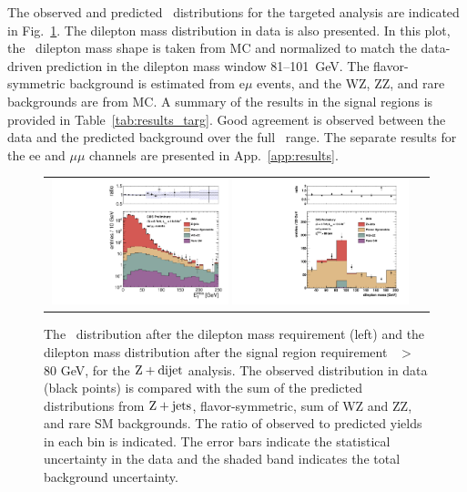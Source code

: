 \clearpage

The observed and predicted \MET\ distributions for the targeted analysis are indicated in Fig.~\ref{fig:results_targ}. 
The dilepton mass distribution in data is also presented. In this plot, the \zjets\ dilepton mass shape is taken from MC
and normalized to match the data-driven prediction in the dilepton mass window 81--101~GeV. The flavor-symmetric background
is estimated from e$\mu$ events, and the WZ, ZZ, and rare backgrounds are from MC.
A summary of the results in the signal regions is provided in Table~\ref{tab:results_targ}. 
Good agreement is observed between the data and the predicted background over the full \MET\ range.
The separate results for the ee and $\mu\mu$ channels are presented in App.~\ref{app:results}.

\begin{figure}[!h]
\begin{center}
\begin{tabular}{cc}
\includegraphics[width=0.49\textwidth]{plots/ZDIJET_metDistribution.pdf} %
\includegraphics[width=0.49\textwidth]{plots/ZDIJET_mllDistribution.pdf}
\end{tabular}
\caption{The \MET\ distribution after the dilepton mass requirement (left) and the dilepton mass distribution after the signal region requirement \MET\ $>$ 80 GeV, 
for the $\rm{Z}+{dijet}$ analysis. The observed distribution in data
(black points) is compared with the sum of the predicted distributions from $\rm{Z}+\rm{jets}$, flavor-symmetric, sum of WZ and ZZ, and rare SM backgrounds. 
The ratio of observed to predicted yields in each bin is
indicated. The error bars indicate the statistical uncertainty in the data and the shaded band indicates the total background uncertainty.
\label{fig:results_targ}
}
\end{center}
\end{figure}



